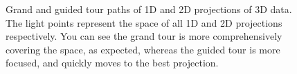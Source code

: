 \documentclass[
  letterpaper,
]{krantz}
\begin{document}
\begin{figure}

\begin{minipage}{0.50\linewidth}



\end{minipage}%
%
\begin{minipage}{0.50\linewidth}



\end{minipage}%

\caption{\label{fig-tour-paths-pdf}Grand and guided tour paths of 1D and
2D projections of 3D data. The light points represent the space of all
1D and 2D projections respectively. You can see the grand tour is more
comprehensively covering the space, as expected, whereas the guided tour
is more focused, and quickly moves to the best projection.}

\end{figure}%
\end{document}
